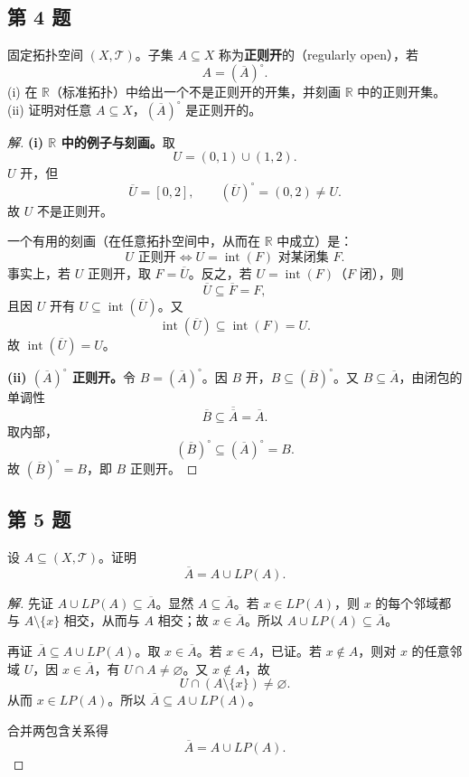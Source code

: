 \documentclass[11pt,a4paper]{article}
\newcommand{\R}{\mathbb{R}}
\theoremstyle{definition}
\newenvironment{solution}{\begin{proof}[解]}{\end{proof}}
\begin{document}
\subsection{第 4 题}

固定拓扑空间 $(X, \mathcal{T})$。子集 $A \subseteq X$ 称为\textbf{正则开}的（regularly open），若
\[
  A = (\overline{A})^\circ.
\]
(i) 在 $\R$（标准拓扑）中给出一个不是正则开的开集，并刻画 $\R$ 中的正则开集。
(ii) 证明对任意 $A \subseteq X$，$(\overline{A})^\circ$ 是正则开的。

\begin{solution}
\textbf{(i) $\R$ 中的例子与刻画。}取
\[
  U = (0,1) \cup (1,2).
\]
$U$ 开，但
\[
  \overline{U} = [0,2], \qquad (\overline{U})^\circ = (0,2) \ne U.
\]
故 $U$ 不是正则开。

一个有用的刻画（在任意拓扑空间中，从而在 $\R$ 中成立）是：
\[
  U \text{ 正则开} \iff U = \operatorname{int}(F) \text{ 对某闭集 } F.
\]
事实上，若 $U$ 正则开，取 $F = \overline{U}$。反之，若 $U = \operatorname{int}(F)$（$F$ 闭），则
\[
  \overline{U} \subseteq \overline{F} = F,
\]
且因 $U$ 开有 $U \subseteq \operatorname{int}(\overline{U})$。又
\[
  \operatorname{int}(\overline{U}) \subseteq \operatorname{int}(F) = U.
\]
故 $\operatorname{int}(\overline{U}) = U$。

\textbf{(ii) $(\overline{A})^\circ$ 正则开。}令 $B = (\overline{A})^\circ$。因 $B$ 开，$B \subseteq (\overline{B})^\circ$。又 $B \subseteq \overline{A}$，由闭包的单调性
\[
  \overline{B} \subseteq \overline{\overline{A}} = \overline{A}.
\]
取内部，
\[
  (\overline{B})^\circ \subseteq (\overline{A})^\circ = B.
\]
故 $(\overline{B})^\circ = B$，即 $B$ 正则开。
\end{solution}

\subsection{第 5 题}

设 $A \subseteq (X, \mathcal{T})$。证明
\[
  \overline{A} = A \cup LP(A).
\]

\begin{solution}
先证 $A \cup LP(A) \subseteq \overline{A}$。显然 $A \subseteq \overline{A}$。若 $x \in LP(A)$，则 $x$ 的每个邻域都与 $A \setminus \{x\}$ 相交，从而与 $A$ 相交；故 $x \in \overline{A}$。所以 $A \cup LP(A) \subseteq \overline{A}$。

再证 $\overline{A} \subseteq A \cup LP(A)$。取 $x \in \overline{A}$。若 $x \in A$，已证。若 $x \notin A$，则对 $x$ 的任意邻域 $U$，因 $x \in \overline{A}$，有 $U \cap A \ne \varnothing$。又 $x \notin A$，故
\[
  U \cap (A \setminus \{x\}) \ne \varnothing.
\]
从而 $x \in LP(A)$。所以 $\overline{A} \subseteq A \cup LP(A)$。

合并两包含关系得
\[
  \overline{A} = A \cup LP(A).
\]
\end{solution}
\end{document}
